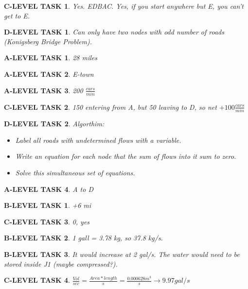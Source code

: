 \documentclass{book}
\numberwithin{equation}{section}
\newtheorem{alevel}{A-LEVEL TASK}
\newtheorem{blevel}{B-LEVEL TASK}
\newtheorem{clevel}{C-LEVEL TASK}
\newtheorem{dlevel}{D-LEVEL TASK}
\theoremstyle{definition}
\begin{document}
\begin{clevel}Yes. EDBAC. Yes, if you start anywhere but E, you can't get to E.\end{clevel}

\begin{dlevel} Can only have two nodes with odd number of roads (Konigsberg Bridge Problem).\end{dlevel}

\begin{alevel}28 miles\end{alevel}

\begin{alevel}E-town\end{alevel}

\begin{alevel}200 $\frac{cars}{min}$\end{alevel}

\begin{clevel}150 entering from A, but 50 leaving to D, so net $+100\frac{cars}{min}$\end{clevel}

\begin{dlevel} Algorthim:\par
\begin{itemize}
\item Label all roads with undetermined flows with a variable.
\item Write an equation for each node that the sum of flows into it sum to zero.
\item Solve this simultaneous set of equations.
\end{itemize}
\end{dlevel}

\begin{alevel} A to D\end{alevel}
\begin{blevel} +6 mi\end{blevel}
\begin{clevel} 0, yes\end{clevel}

\begin{blevel}1 gall = 3.78 kg, so 37.8 kg/s.\end{blevel}

\begin{blevel}It would increase at 2 gal/s. The water would need to be stored inside J1 (maybe compressed?).\end{blevel}

\begin{clevel}$\frac{Vol}{sec}=\frac{Area*length}{s}=\frac{0.000628m^3}{s} \rightarrow 9.97 gal/s$\end{clevel}
\end{document}
